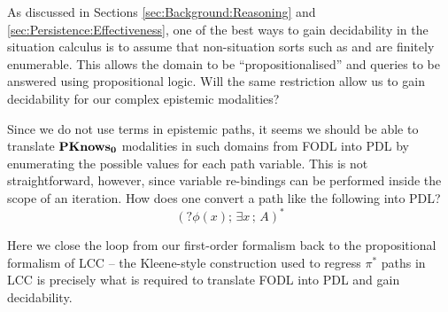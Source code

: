 As discussed in Sections \ref{sec:Background:Reasoning} and \ref{sec:Persistence:Effectiveness},
one of the best ways to gain decidability in the situation calculus
is to assume that non-situation sorts such as  and 
are finitely enumerable. This allows the domain to be {}``propositionalised''
and queries to be answered using propositional logic. Will the same
restriction allow us to gain decidability for our complex epistemic
modalities?

Since we do not use  terms in epistemic paths, it
seems we should be able to translate $\mathbf{PKnows_{0}}$ modalities in such
domains from FODL into PDL by enumerating the possible values for
each path variable. This is not straightforward, however, since variable
re-bindings can be performed inside the scope of an iteration. How
does one convert a path like the following into PDL?\[
(?\phi(x);\,\exists x\,;\, A)^{*}\]


Here we close the loop from our first-order formalism back to the
propositional formalism of LCC -- the Kleene-style construction used
to regress $\pi^{*}$ paths in LCC is precisely what is required to
translate FODL into PDL and gain decidability.

